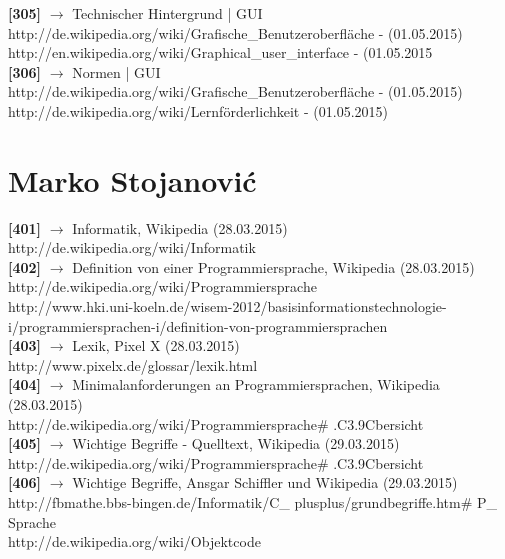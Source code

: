 \documentclass[12pt,a4paper]{report}
\begin{document}
\begin{onehalfspace}
\noindent
\textbf{[305]} $\rightarrow$ Technischer Hintergrund | GUI \\
http://de.wikipedia.org/wiki/Grafische\_Benutzeroberfläche - (01.05.2015)\\
http://en.wikipedia.org/wiki/Graphical\_user\_interface - (01.05.2015\\

\noindent
\textbf{[306]} $\rightarrow$ Normen | GUI \\
http://de.wikipedia.org/wiki/Grafische\_Benutzeroberfläche - (01.05.2015)\\
http://de.wikipedia.org/wiki/Lernförderlichkeit - (01.05.2015)


\chapter{Marko Stojanovi\'{c}}

\noindent
\textbf{[401]} $\rightarrow$ Informatik, Wikipedia (28.03.2015)\\
http://de.wikipedia.org/wiki/Informatik\\

\noindent
\textbf{[402]} $\rightarrow$ Definition von einer Programmiersprache, Wikipedia (28.03.2015)\\
http://de.wikipedia.org/wiki/Programmiersprache\\
http://www.hki.uni-koeln.de/wisem-2012/basisinformationstechnologie-i/programmiersprachen-i/definition-von-programmiersprachen\\

\noindent
\textbf{[403]} $\rightarrow$ Lexik, Pixel X (28.03.2015)\\
http://www.pixelx.de/glossar/lexik.html\\

\noindent
\textbf{[404]} $\rightarrow$ Minimalanforderungen an Programmiersprachen, Wikipedia (28.03.2015)\\
http://de.wikipedia.org/wiki/Programmiersprache\# .C3.9Cbersicht\\

\noindent
\textbf{[405]} $\rightarrow$ Wichtige Begriffe - Quelltext, Wikipedia (29.03.2015)\\
http://de.wikipedia.org/wiki/Programmiersprache\# .C3.9Cbersicht\\

\noindent
\textbf{[406]} $\rightarrow$ Wichtige Begriffe, Ansgar Schiffler und Wikipedia (29.03.2015)\\
http://fbmathe.bbs-bingen.de/Informatik/C\_ plusplus/grundbegriffe.htm\# P\_ Sprache\\
http://de.wikipedia.org/wiki/Objektcode\\


\end{onehalfspace}
\end{document}
